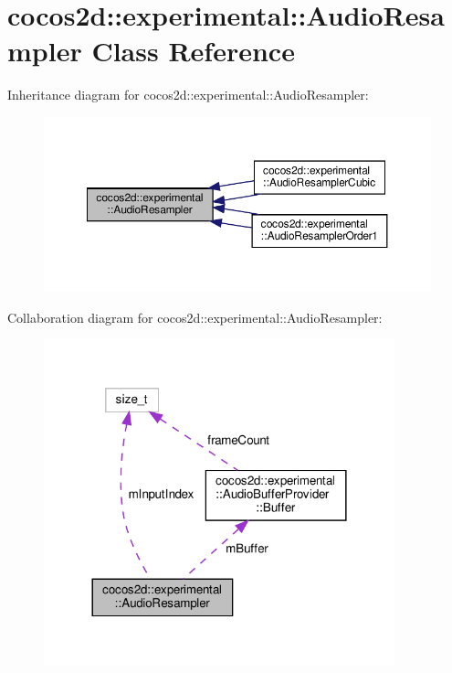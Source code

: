 \hypertarget{classcocos2d_1_1experimental_1_1AudioResampler}{}\section{cocos2d\+:\+:experimental\+:\+:Audio\+Resampler Class Reference}
\label{classcocos2d_1_1experimental_1_1AudioResampler}


Inheritance diagram for cocos2d\+:\+:experimental\+:\+:Audio\+Resampler\+:
\nopagebreak
\begin{figure}[H]
\begin{center}
\leavevmode
\includegraphics[width=350pt]{classcocos2d_1_1experimental_1_1AudioResampler__inherit__graph}
\end{center}
\end{figure}


Collaboration diagram for cocos2d\+:\+:experimental\+:\+:Audio\+Resampler\+:
\nopagebreak
\begin{figure}[H]
\begin{center}
\leavevmode
\includegraphics[width=288pt]{classcocos2d_1_1experimental_1_1AudioResampler__coll__graph}
\end{center}
\end{figure}
